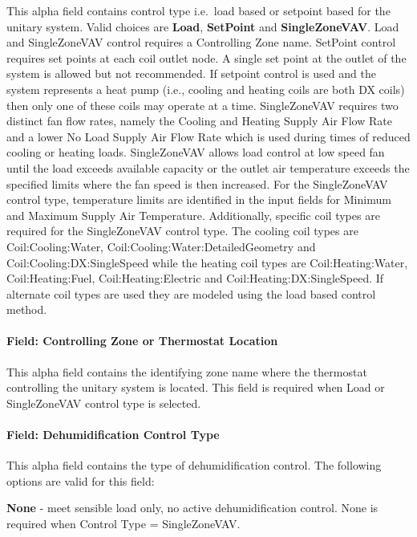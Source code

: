 This alpha field contains control type i.e.~load based or setpoint based for the unitary system. Valid choices are \textbf{Load}, \textbf{SetPoint} and \textbf{SingleZoneVAV}. Load and SingleZoneVAV control requires a Controlling Zone name. SetPoint control requires set points at each coil outlet node. A single set point at the outlet of the system is allowed but not recommended. If setpoint control is used and the system represents a heat pump (i.e., cooling and heating coils are both DX coils) then only one of these coils may operate at a time. SingleZoneVAV requires two distinct fan flow rates, namely the Cooling and Heating Supply Air Flow Rate and a lower No Load Supply Air Flow Rate which is used during times of reduced cooling or heating loads. SingleZoneVAV allows load control at low speed fan until the load exceeds available capacity or the outlet air temperature exceeds the specified limits where the fan speed is then increased. For the SingleZoneVAV control type, temperature limits are identified in the input fields for Minimum and Maximum Supply Air Temperature. Additionally, specific coil types are required for the SingleZoneVAV control type. The cooling coil types are Coil:Cooling:Water, Coil:Cooling:Water:DetailedGeometry and Coil:Cooling:DX:SingleSpeed while the heating coil types are Coil:Heating:Water, Coil:Heating:Fuel, Coil:Heating:Electric and Coil:Heating:DX:SingleSpeed. If alternate coil types are used they are modeled using the load based control method. 

\paragraph{Field: Controlling Zone or Thermostat Location}\label{field-controlling-zone-or-thermostat-location}

This alpha field contains the identifying zone name where the thermostat controlling the unitary system is located. This field is required when Load or SingleZoneVAV control type is selected.

\paragraph{Field: Dehumidification Control Type}\label{field-dehumidification-control-type-001}

This alpha field contains the type of dehumidification control. The following options are valid for this field:

\textbf{None} - meet sensible load only, no active dehumidification control. None is required when Control Type = SingleZoneVAV.

